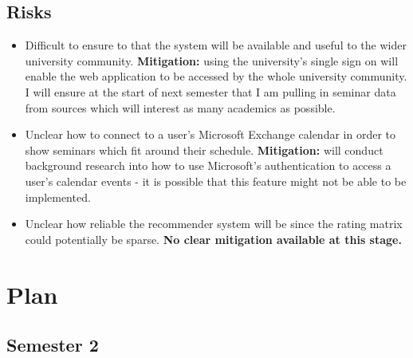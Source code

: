 \documentclass[11pt]{article}
\begin{document}
\subsection{Risks}\label{risks}

\begin{itemize}
\tightlist
\item Difficult to ensure to that the system will be available and useful to the wider university community. \textbf{Mitigation:} using the university's single sign on will enable the web application to be accessed by the whole university community. I will ensure at the start of next semester that I am pulling in seminar data from sources which will interest as many academics as possible.
\item Unclear how to connect to a user's Microsoft Exchange calendar in order to show seminars which fit around their schedule. \textbf{Mitigation:} will conduct background research into how to use Microsoft's authentication to access a user's calendar events - it is possible that this feature might not be able to be implemented.
\item Unclear how reliable the recommender system will be since the rating matrix could potentially be sparse. \textbf{No clear mitigation available at this stage.}
\end{itemize}
    
\section{Plan}\label{plan}

\subsection{Semester 2}
\end{document}
